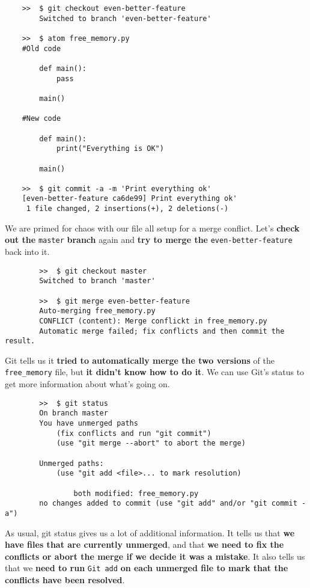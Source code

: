	\begin{verbatim}
	>>	$ git checkout even-better-feature
		Switched to branch 'even-better-feature'
		
	>>  $ atom free_memory.py
	#Old code
		
		def main():
			pass
			
		main()
		
	#New code
		
		def main():
			print("Everything is OK")
		
		main()
	
	>>  $ git commit -a -m 'Print everything ok'
	[even-better-feature ca6de99] Print everything ok'
	 1 file changed, 2 insertions(+), 2 deletions(-)
	\end{verbatim}
	
	We are primed for chaos with our file all setup for a merge conflict. Let's \textbf{check out the} \texttt{master} \textbf{branch} again and \textbf{try to merge the} \verb|even-better-feature| back into it. 
	
	\begin{verbatim}
		>>	$ git checkout master
		Switched to branch 'master'
		
		>>  $ git merge even-better-feature
		Auto-merging free_memory.py
		CONFLICT (content): Merge conflickt in free_memory.py
		Automatic merge failed; fix conflicts and then commit the result.
	\end{verbatim}

	Git tells us it \textbf{tried to automatically merge the two versions} of the \verb|free_memory| file, but \textbf{it didn't know how to do it}. We can use Git's status to get more information about what's going on.
	
	\begin{verbatim}
		>>	$ git status
		On branch master
		You have unmerged paths
			(fix conflicts and run "git commit")
			(use "git merge --abort" to abort the merge)
			
		Unmerged paths:
			(use "git add <file>... to mark resolution)

				both modified: free_memory.py
		no changes added to commit (use "git add" and/or "git commit -a")		
	\end{verbatim}
	
	
	As usual, git status gives us a lot of additional information. It tells us that \textbf{we have files that are currently unmerged}, and that \textbf{we need to fix the conflicts or abort the merge if we decide it was a mistake}. It also tells us that we \textbf{need to run} \texttt{Git add} \textbf{on each unmerged file to mark that the conflicts have been resolved}. 
	
